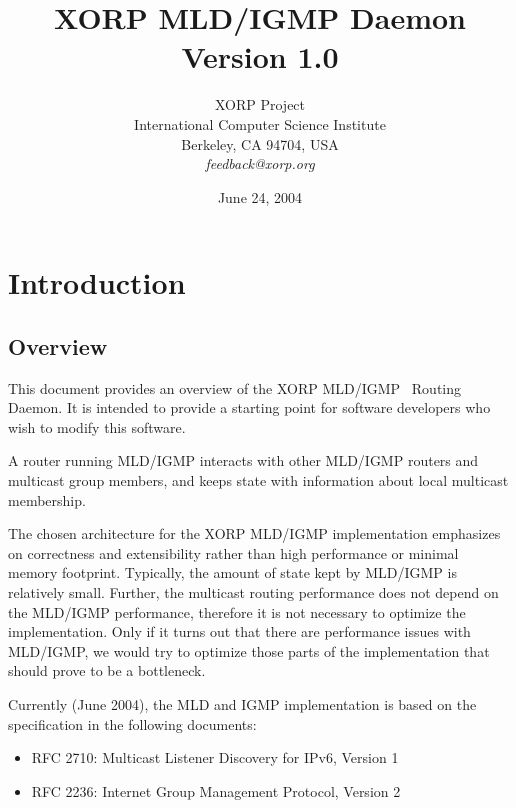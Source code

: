 \documentclass[11pt]{article}
\begin{document}
\title{XORP MLD/IGMP Daemon \\
\vspace{1ex}
Version 1.0}
\author{ XORP Project					\\
	 International Computer Science Institute	\\
	 Berkeley, CA 94704, USA			\\
	 {\it feedback@xorp.org}
}
\date{June 24, 2004}

\maketitle

\thispagestyle{empty}


\section{Introduction}


\subsection{Overview}

This document provides an overview of the XORP MLD/IGMP~\cite{MLD-V1,IGMP-V2}
Routing Daemon. It is intended to provide a starting point for software
developers who wish to modify this software.

A router running MLD/IGMP interacts with other MLD/IGMP routers and
multicast group members, and keeps state with information about local
multicast membership.

The chosen architecture for the XORP MLD/IGMP implementation emphasizes on
correctness and extensibility rather than high performance or minimal
memory footprint. Typically, the amount of state kept by MLD/IGMP is
relatively small. Further, the multicast routing performance does not
depend on the MLD/IGMP performance, therefore it is not necessary to
optimize the implementation. Only if it turns out that there are
performance issues with MLD/IGMP, we would try to optimize those parts of the
implementation that should prove to be a bottleneck.

Currently (June 2004), the MLD and IGMP implementation is based
on the specification in the following documents:

\begin{itemize}
  \item RFC 2710: Multicast Listener Discovery for IPv6, Version 1
  \item RFC 2236: Internet Group Management Protocol, Version 2
\end{itemize}
\end{document}
